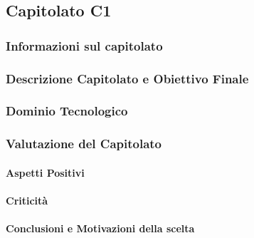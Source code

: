 \subsection{Capitolato C1}

\subsubsection{Informazioni sul capitolato}

\subsubsection{Descrizione Capitolato e Obiettivo Finale}

\subsubsection{Dominio Tecnologico}

\subsubsection{Valutazione del Capitolato}

\paragraph{Aspetti Positivi}

\paragraph{Criticità}

\paragraph{Conclusioni e Motivazioni della scelta}



